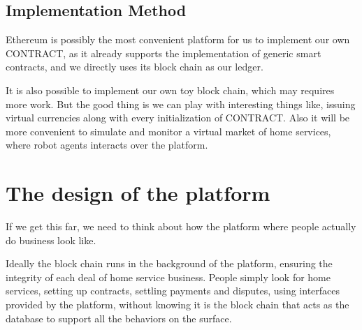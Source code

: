 \documentclass[]{scrartcl}
\begin{document}
\subsection{Implementation Method}

Ethereum is possibly the most convenient platform for us to implement our own CONTRACT, as it already supports the implementation of generic smart contracts, and we directly uses its block chain as our ledger. 

It is also possible to implement our own toy block chain, which may requires more work. But the good thing is we can play with interesting things like, issuing virtual currencies along with every initialization of CONTRACT. Also it will be more convenient to simulate and monitor a virtual market of home services, where robot agents interacts over the platform.

\section{The design of the platform}

If we get this far, we need to think about how the platform where people actually do business look like.

Ideally the block chain runs in the background of the platform, ensuring the integrity of each deal of home service business. People simply look for home services, setting up contracts, settling payments and disputes, using interfaces provided by the platform, without knowing it is the block chain that acts as the database to support all the behaviors on the surface.





\end{document}
